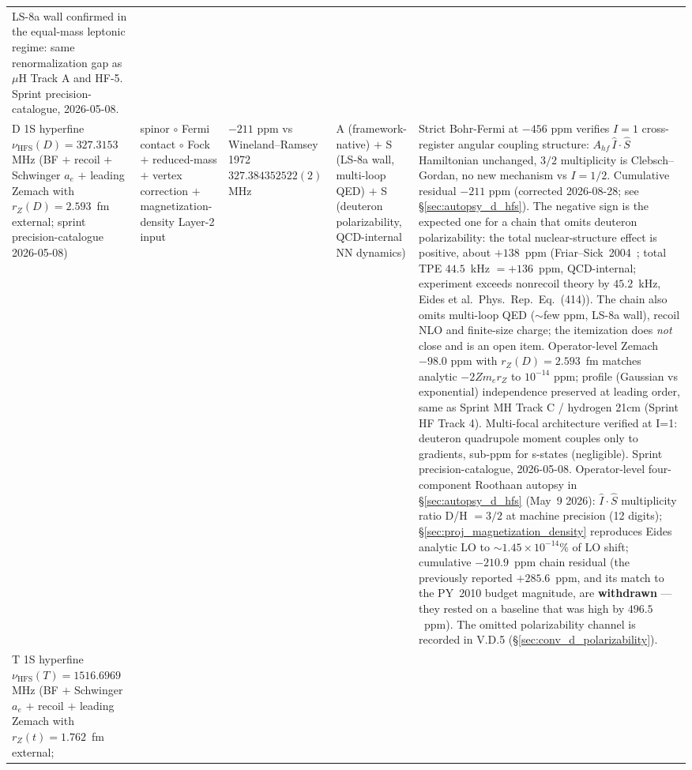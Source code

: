 \documentclass[11pt]{article}
\begin{document}
{\begin{longtable}{p{3.8cm} p{2.5cm} p{1.5cm} p{1.4cm} p{4.5cm}}
LS-8a wall confirmed in the equal-mass leptonic regime: same
renormalization gap as $\mu$H Track A and HF-5.  Sprint precision-catalogue,
2026-05-08. \\
D 1S hyperfine $\nu_\text{HFS}(D) = 327.3153$ MHz (BF $+$ recoil
$+$ Schwinger $a_e$ $+$ leading Zemach with $r_Z(D) = 2.593$~fm
external; sprint precision-catalogue 2026-05-08) & spinor $\circ$ Fermi
contact $\circ$ Fock $+$ reduced-mass $+$ vertex correction
$+$ magnetization-density Layer-2 input
& $-211$ ppm vs Wineland--Ramsey 1972 $327.384352522(2)$ MHz & A
(framework-native) $+$ S (LS-8a wall, multi-loop QED) $+$ S (deuteron
polarizability, QCD-internal NN dynamics)
& Strict Bohr-Fermi at $-456$ ppm verifies $I=1$ cross-register angular
coupling structure: $A_{hf}\,\hat{I}\cdot\hat{S}$ Hamiltonian unchanged,
$3/2$ multiplicity is Clebsch--Gordan, no new mechanism vs $I=1/2$.
Cumulative residual $-211$ ppm (corrected 2026-08-28; see
\S\ref{sec:autopsy_d_hfs}).  The negative sign is the expected one for a
chain that omits deuteron polarizability: the total nuclear-structure
effect is positive, about $+138$~ppm (Friar--Sick~2004~\cite{friar_sick2004};
total TPE $44.5$~kHz $= +136$~ppm, QCD-internal; experiment exceeds
nonrecoil theory by $45.2$~kHz, Eides et al.\ Phys.\ Rep.\ Eq.~(414)).
The chain also omits multi-loop QED ($\sim$few ppm, LS-8a wall), recoil
NLO and finite-size charge; the itemization does \emph{not} close and is
an open item.
Operator-level Zemach $-98.0$ ppm with $r_Z(D) = 2.593$~fm matches
analytic $-2 Z m_e r_Z$ to $10^{-14}$ ppm; profile (Gaussian vs
exponential) independence preserved at leading order, same as Sprint MH
Track C / hydrogen 21cm (Sprint HF Track 4).  Multi-focal architecture
verified at I=1: deuteron quadrupole moment couples only to gradients,
sub-ppm for s-states (negligible).  Sprint precision-catalogue,
2026-05-08.  Operator-level four-component Roothaan autopsy in
\S\ref{sec:autopsy_d_hfs} (May~9 2026): $\hat{I}\cdot\hat{S}$
multiplicity ratio D/H $= 3/2$ at machine precision (12 digits);
\S\ref{sec:proj_magnetization_density} reproduces Eides analytic LO
to $\sim 1.45 \times 10^{-14}\%$ of LO shift; cumulative $-210.9$~ppm
chain residual (the previously reported $+285.6$~ppm, and its match to
the PY~2010 budget magnitude, are \textbf{withdrawn} --- they rested on
a baseline that was high by $496.5$~ppm).  The omitted polarizability
channel is recorded in V.D.5 (\S\ref{sec:conv_d_polarizability}). \\
T 1S hyperfine $\nu_\text{HFS}(T) = 1516.6969$ MHz (BF $+$ Schwinger
$a_e$ $+$ recoil $+$ leading Zemach with $r_Z(t) = 1.762$~fm external;

\end{longtable}}
\end{document}
